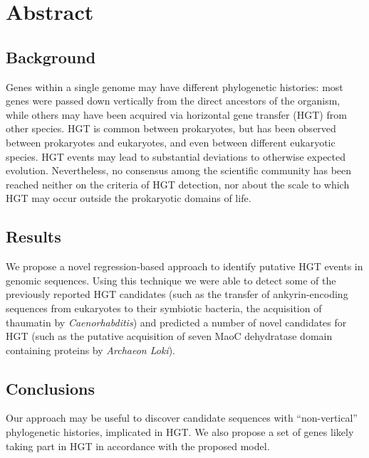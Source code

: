 \section{Abstract}
\label{abstract}

\subsection{Background}
\label{bg}
Genes within a single genome may have different phylogenetic histories: most
genes were passed down vertically from the direct ancestors of the organism,
while others may have been acquired via horizontal gene transfer (HGT) from
other species. HGT is common between prokaryotes, but has been observed between
prokaryotes and eukaryotes, and even between different eukaryotic species. HGT
events may lead to substantial deviations to otherwise expected evolution.
Nevertheless, no consensus among the scientific community has been reached
neither on the criteria of HGT detection, nor about the scale to which HGT may
occur outside the prokaryotic domains of life.

\subsection{Results}
\label{res}
We propose a novel regression-based approach to identify putative HGT events in
genomic sequences. Using this technique we were able to detect some of the
previously reported HGT candidates (such as the transfer of ankyrin-encoding
sequences from eukaryotes to their symbiotic bacteria, the acquisition of
thaumatin by \textit{Caenorhabditis}) and predicted a number of novel
candidates for HGT (such as the putative acquisition of seven MaoC dehydratase
domain containing proteins by \textit{Archaeon Loki}).

\subsection{Conclusions}
\label{concl}
Our approach may be useful to discover candidate sequences with
``non-vertical'' phylogenetic histories, implicated in HGT. We also propose a
set of genes likely taking part in HGT in accordance with the proposed model.

